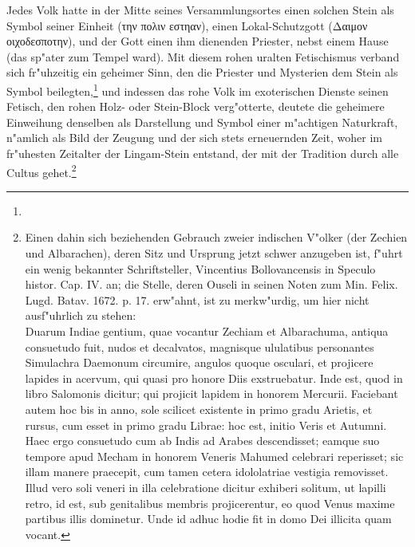 \documentclass[a4paper, 11pt, oneside, polutonikogreek, german]{article}
\begin{document}
Jedes Volk hatte in der Mitte seines Versammlungsortes einen solchen Stein als Symbol seiner Einheit (την πολιν εστηαν), einen Lokal-Schutzgott (Δαιμον οιχοδεσποτην), und der Gott einen ihm dienenden Priester, nebst einem Hause (das sp"ater zum Tempel ward). Mit diesem rohen uralten Fetischismus verband sich fr"uhzeitig ein geheimer Sinn, den die Priester und Mysterien dem Stein als Symbol beilegten,\footnote{} und indessen das rohe Volk im exoterischen Dienste seinen Fetisch, den rohen Holz- oder Stein-Block verg"otterte, deutete die geheimere Einweihung denselben als Darstellung und Symbol einer m"achtigen Naturkraft, n"amlich als Bild der Zeugung und der sich stets erneuernden Zeit, woher im fr"uhesten Zeitalter der Lingam-Stein entstand, der mit der Tradition durch alle Cultus gehet.\footnote{Einen dahin sich beziehenden Gebrauch zweier indischen V"olker (der Zechien und Albarachen), deren Sitz und Ursprung jetzt schwer anzugeben ist, f"uhrt ein wenig bekannter Schriftsteller, Vincentius Bollovancensis in Speculo histor. Cap. IV. an; die Stelle, deren Ouseli in seinen Noten zum Min. Felix. Lugd. Batav. 1672. p. 17. erw"ahnt, ist zu merkw"urdig, um hier nicht ausf"uhrlich zu stehen:\\
\hspace*{0.5cm} Duarum Indiae gentium, quae vocantur Zechiam et Albarachuma, antiqua consuetudo fuit, nudos et decalvatos, magnisque ululatibus personantes Simulachra Daemonum circumire, angulos quoque osculari, et projicere lapides in acervum, qui quasi pro honore Diis exstruebatur. Inde est, quod in libro Salomonis dicitur; qui projicit lapidem in honorem Mercurii. Faciebant autem hoc bis in anno, sole scilicet existente in primo gradu Arietis, et rursus, cum esset in primo gradu Librae: hoc est, initio Veris et Autumni. Haec ergo consuetudo cum ab Indis ad Arabes descendisset; eamque suo tempore apud Mecham in honorem Veneris Mahumed celebrari reperisset; sic illam manere praecepit, cum tamen cetera idololatriae vestigia removisset. Illud vero soli veneri in illa celebratione dicitur exhiberi solitum, ut lapilli retro, id est, sub genitalibus membris projicerentur, eo quod Venus maxime partibus illis dominetur. Unde id adhuc hodie fit in domo Dei illicita quam vocant.}
\end{document}
